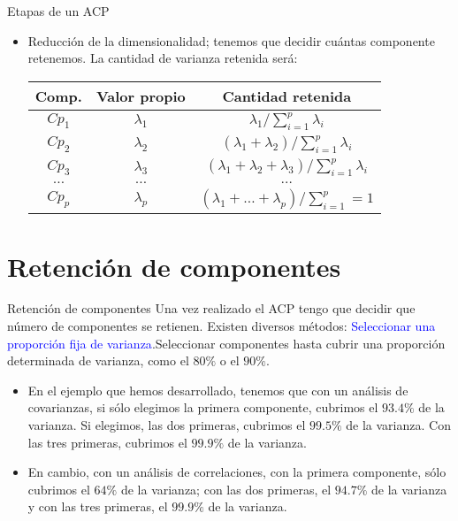 \documentclass[
  spanish,
  ignorenonframetext,
]{beamer}
\providecommand{\tightlist}{%
  \setlength{\itemsep}{0pt}\setlength{\parskip}{0pt}}
\newcommand\blue[1]{\textcolor{blue}{#1}}
\begin{document}
\begin{frame}{Etapas de un ACP}
\protect\hypertarget{etapas-de-un-acp-2}{}
\begin{itemize}
\tightlist
\item
  Reducción de la dimensionalidad; tenemos que decidir cuántas
  componente retenemos. La cantidad de varianza retenida será:
  \vskip 0.5cm

  \begin{tabular}{|c|c|c|}\hline
  Comp. & Valor propio & Cantidad retenida\\\hline
  $Cp_1$  & $\lambda_1$ & $\lambda_1/\sum_{i=1}^p \lambda_i$\\
  $Cp_2 $ & $\lambda_2$ & $(\lambda_1+\lambda_2)/\sum_{i=1}^p \lambda_i$\\
  $Cp_3$ & $\lambda_3$ &
  $(\lambda_1+\lambda_2+\lambda_3)/\sum_{i=1}^p
  \lambda_i$\\ $\ldots$ & $\ldots$ & $\ldots$\\
  $Cp_p$ & $\lambda_p$ &
  $(\lambda_1+\ldots+\lambda_p)/\sum_{i=1}^p=1$\\\hline
  \end{tabular}
\end{itemize}
\end{frame}

\hypertarget{retenciuxf3n-de-componentes}{%
\section{Retención de componentes}\label{retenciuxf3n-de-componentes}}

\begin{frame}{Retención de componentes}
\protect\hypertarget{retenciuxf3n-de-componentes-1}{}
Una vez realizado el ACP tengo que decidir que número de componentes se
retienen. Existen diversos métodos:
\blue{Seleccionar una proporción fija de varianza}.Seleccionar
componentes hasta cubrir una proporción determinada de varianza, como el
\(80\%\) o el \(90\%\).

\begin{itemize}
\tightlist
\item
  En el ejemplo que hemos desarrollado, tenemos que con un análisis de
  covarianzas, si sólo elegimos la primera componente, cubrimos el
  \(93.4\%\) de la varianza. Si elegimos, las dos primeras, cubrimos el
  \(99.5\%\) de la varianza. Con las tres primeras, cubrimos el
  \(99.9\%\) de la varianza.
\item
  En cambio, con un análisis de correlaciones, con la primera
  componente, sólo cubrimos el \(64\%\) de la varianza; con las dos
  primeras, el \(94.7\%\) de la varianza y con las tres primeras, el
  \(99.9\%\) de la varianza.
\end{itemize}
\end{frame}
\end{document}
